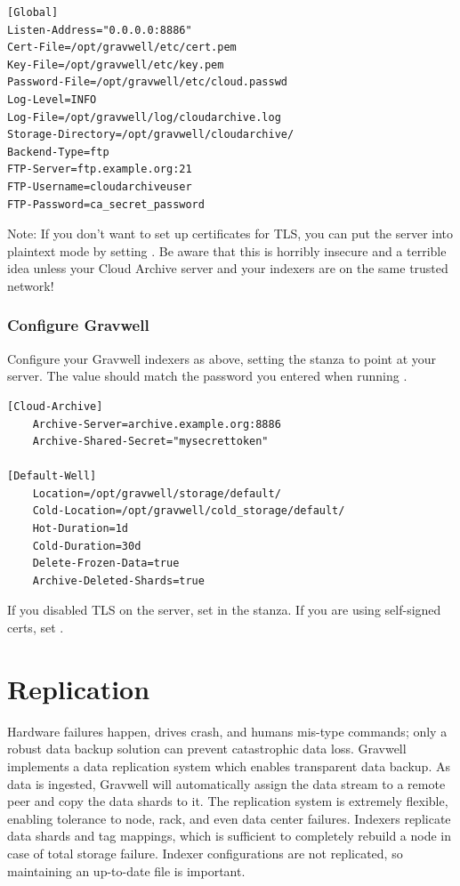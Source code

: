 {{\begin{verbatim}
[Global]
Listen-Address="0.0.0.0:8886"
Cert-File=/opt/gravwell/etc/cert.pem
Key-File=/opt/gravwell/etc/key.pem
Password-File=/opt/gravwell/etc/cloud.passwd
Log-Level=INFO
Log-File=/opt/gravwell/log/cloudarchive.log
Storage-Directory=/opt/gravwell/cloudarchive/
Backend-Type=ftp
FTP-Server=ftp.example.org:21
FTP-Username=cloudarchiveuser
FTP-Password=ca_secret_password
\end{verbatim}

Note: If you don't want to set up certificates for TLS, you can put the server into plaintext mode by setting . Be aware that this is horribly insecure and a terrible idea unless your Cloud Archive server and your indexers are on the same trusted network!

\subsubsection{Configure Gravwell}

Configure your Gravwell indexers as above, setting the  stanza to point at your server. The  value should match the password you entered when running .

\begin{verbatim}
[Cloud-Archive]
	Archive-Server=archive.example.org:8886
	Archive-Shared-Secret="mysecrettoken"

[Default-Well]
	Location=/opt/gravwell/storage/default/
	Cold-Location=/opt/gravwell/cold_storage/default/
	Hot-Duration=1d
	Cold-Duration=30d
	Delete-Frozen-Data=true
	Archive-Deleted-Shards=true
\end{verbatim}

If you disabled TLS on the server, set  in the  stanza. If you are using self-signed certs, set .

\clearpage
\section{Replication}
Hardware failures happen, drives crash, and humans mis-type commands;
only a robust data backup solution can prevent catastrophic data loss.
Gravwell implements a data replication system which enables transparent
data backup. As data is ingested, Gravwell will automatically assign
the data stream to a remote peer and copy the data shards to it. The
replication system is extremely flexible, enabling tolerance to node,
rack, and even data center failures. Indexers replicate data shards and
tag mappings, which is sufficient to completely rebuild a node in case
of total storage failure. Indexer configurations are not replicated, so
maintaining an up-to-date  file is important.}

}
